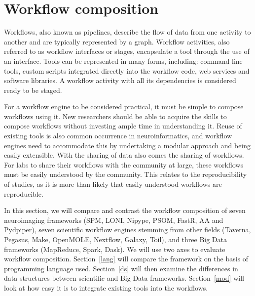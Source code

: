     \section{Workflow composition}\label{workcomp}

        Workflows, also known as pipelines, describe the flow of data from one
        activity to another and are typically represented by a graph. Workflow
        activities, also referred to as workflow interfaces or stages,
        encapsulate a tool through the use of an interface. Tools can be
        represented in many forms, including: command-line tools, custom scripts
        integrated directly into the workflow code, web services and software
        libraries. A workflow activity with all its dependencies is considered
        ready to be staged.

        For a workflow engine to be considered practical, it must be simple to
        compose workflows using it. New researchers should be able
        to acquire the skills to compose workflows without investing ample time in understanding it. Reuse of existing tools
        is also common occurrence in neuroinformatics, and workflow engines need
        to accommodate this by undertaking a modular approach and being easily
        extensible. With the sharing of data also comes the sharing of
        workflows. For labs to share their workflows with the community at
        large, these workflows must be easily understood by the community. This
        relates to the reproducibility of studies, as it is more than likely
        that easily understood workflows are reproducible. 

        In this section, we will compare and contrast the workflow composition
        of seven neuroimaging frameworks (SPM, LONI, Nipype, PSOM, FastR, AA and
        Pydpiper), seven scientific workflow engines stemming from other fields
        (Taverna, Pegasus, Make, OpenMOLE, Nextflow, Galaxy, Toil), and three
        Big Data frameworks (MapReduce, Spark, Dask). We will use two axes to
        evaluate workflow composition. Section~\ref{lang} will compare the
        framework on the basis of programming language used. Section~\ref{ds}
        will then examine the differences in data structures between scientific
        and Big Data frameworks. Section~\ref{mod} will look at how easy it is
        to integrate existing tools into the workflows.

